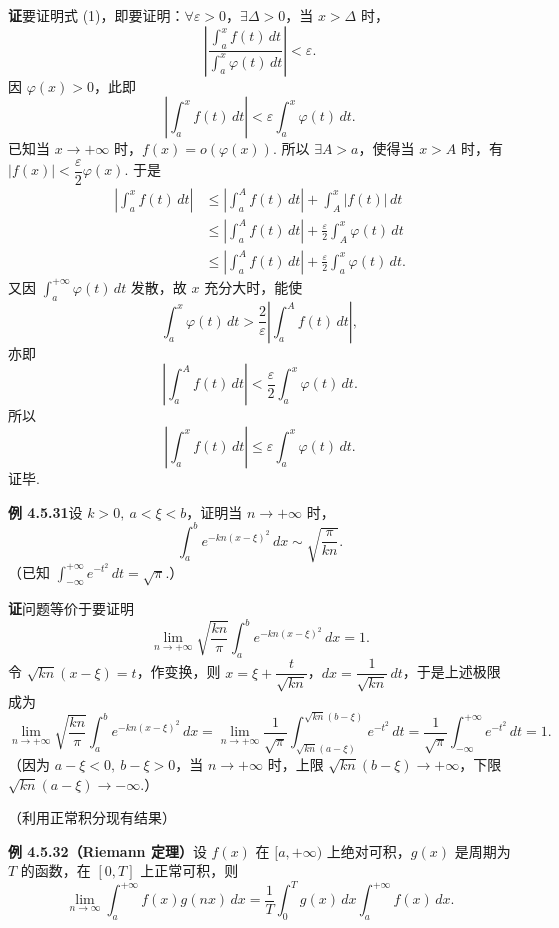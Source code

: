 \documentclass[UTF8,12pt,a4paper,fontset=fandol]{ctexart}
\begin{document}
\noindent\textbf{证}\quad 要证明式 (1)，即要证明：$\forall\varepsilon>0$，$\exists\Delta>0$，当 $x>\Delta$ 时，
\[
\left|\frac{\displaystyle\int_a^x f(t)\,dt}{\displaystyle\int_a^x\varphi(t)\,dt}\right|<\varepsilon.
\]
因 $\varphi(x)>0$，此即
\[
\left|\int_a^x f(t)\,dt\right|<\varepsilon\int_a^x\varphi(t)\,dt.
\]
已知当 $x\to+\infty$ 时，$f(x)=o(\varphi(x))$. 所以 $\exists A>a$，使得当 $x>A$ 时，有
$|f(x)|<\dfrac\varepsilon2\varphi(x)$. 于是
\begin{equation}
\begin{aligned}
\left|\int_a^x f(t)\,dt\right|
&\le\left|\int_a^A f(t)\,dt\right|+\int_A^x|f(t)|\,dt\\
&\le\left|\int_a^A f(t)\,dt\right|+\frac\varepsilon2\int_A^x\varphi(t)\,dt\\
&\le\left|\int_a^A f(t)\,dt\right|+\frac\varepsilon2\int_a^x\varphi(t)\,dt.
\end{aligned}
\tag{2}
\end{equation}
又因 $\displaystyle\int_a^{+\infty}\varphi(t)\,dt$ 发散，故 $x$ 充分大时，能使
\[
\int_a^x\varphi(t)\,dt>\frac2\varepsilon\left|\int_a^A f(t)\,dt\right|,
\]
亦即
\[
\left|\int_a^A f(t)\,dt\right|<\frac\varepsilon2\int_a^x\varphi(t)\,dt.
\]
所以
\[
\left|\int_a^x f(t)\,dt\right|\le\varepsilon\int_a^x\varphi(t)\,dt.
\]
证毕.

\noindent\textbf{例 4.5.31}\quad 设 $k>0,\ a<\xi<b$，证明当 $n\to+\infty$ 时，
\[
\int_a^b e^{-kn(x-\xi)^2}\,dx\sim\sqrt{\frac\pi{kn}}.
\]
（已知 $\displaystyle\int_{-\infty}^{+\infty}e^{-t^2}\,dt=\sqrt\pi$.）

\noindent\textbf{证}\quad 问题等价于要证明
\[
\lim_{n\to+\infty}\sqrt{\frac{kn}\pi}\int_a^b e^{-kn(x-\xi)^2}\,dx=1.
\]
令 $\sqrt{kn}(x-\xi)=t$，作变换，则 $x=\xi+\dfrac{t}{\sqrt{kn}}$，$dx=\dfrac1{\sqrt{kn}}\,dt$，于是上述极限成为
\[
\lim_{n\to+\infty}\sqrt{\frac{kn}\pi}\int_a^b e^{-kn(x-\xi)^2}\,dx
=\lim_{n\to+\infty}\frac1{\sqrt\pi}\int_{\sqrt{kn}(a-\xi)}^{\sqrt{kn}(b-\xi)}e^{-t^2}\,dt
=\frac1{\sqrt\pi}\int_{-\infty}^{+\infty}e^{-t^2}\,dt=1.
\]
（因为 $a-\xi<0,\ b-\xi>0$，当 $n\to+\infty$ 时，上限 $\sqrt{kn}(b-\xi)\to+\infty$，下限
$\sqrt{kn}(a-\xi)\to-\infty$.）

（利用正常积分现有结果）

\noindent\textbf{例 4.5.32（Riemann 定理）}\quad 设 $f(x)$ 在 $[a,+\infty)$ 上绝对可积，$g(x)$ 是周期为 $T$ 的函数，在 $[0,T]$ 上正常可积，则
\begin{equation}
\lim_{n\to\infty}\int_a^{+\infty}f(x)g(nx)\,dx
=\frac1T\int_0^T g(x)\,dx\int_a^{+\infty}f(x)\,dx. \tag{1}
\end{equation}
\end{document}
